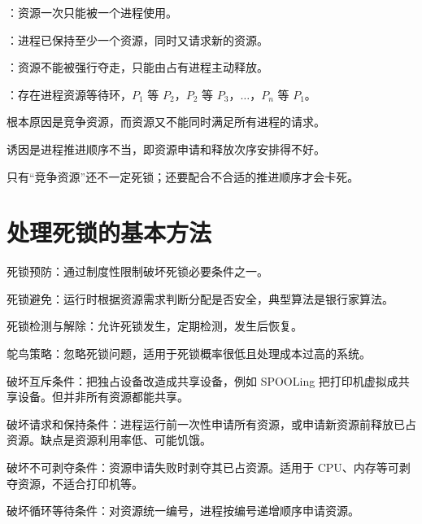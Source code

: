 \begin{points}
  \item {}：资源一次只能被一个进程使用。
  \item {}：进程已保持至少一个资源，同时又请求新的资源。
  \item {}：资源不能被强行夺走，只能由占有进程主动释放。
  \item {}：存在进程资源等待环，$P_1$ 等 $P_2$，$P_2$ 等 $P_3$，$\ldots$，$P_n$ 等 $P_1$。
\end{points}

\begin{points}
  \item 根本原因是竞争资源，而资源又不能同时满足所有进程的请求。
  \item 诱因是进程推进顺序不当，即资源申请和释放次序安排得不好。
  \item 只有“竞争资源”还不一定死锁；还要配合不合适的推进顺序才会卡死。
\end{points}

\section{处理死锁的基本方法}
\begin{points}
  \item 死锁预防：通过制度性限制破坏死锁必要条件之一。
  \item 死锁避免：运行时根据资源需求判断分配是否安全，典型算法是银行家算法。
  \item 死锁检测与解除：允许死锁发生，定期检测，发生后恢复。
  \item 鸵鸟策略：忽略死锁问题，适用于死锁概率很低且处理成本过高的系统。
\end{points}


\begin{points}
  \item 破坏互斥条件：把独占设备改造成共享设备，例如 SPOOLing 把打印机虚拟成共享设备。但并非所有资源都能共享。
  \item 破坏请求和保持条件：进程运行前一次性申请所有资源，或申请新资源前释放已占资源。缺点是资源利用率低、可能饥饿。
  \item 破坏不可剥夺条件：资源申请失败时剥夺其已占资源。适用于 CPU、内存等可剥夺资源，不适合打印机等。
  \item 破坏循环等待条件：对资源统一编号，进程按编号递增顺序申请资源。
\end{points}


